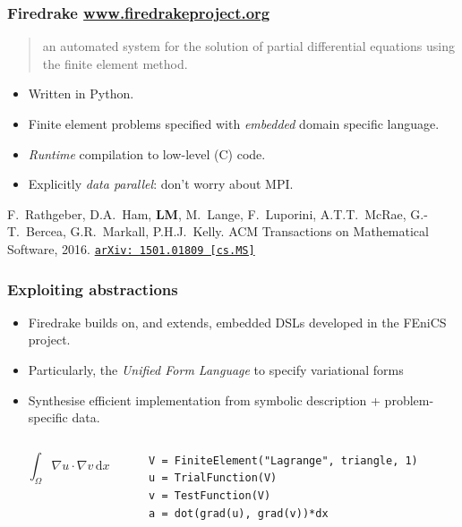 \documentclass[presentation]{beamer}
\newcommand{\arxivlink}[2]{%
  \href{http://www.arxiv.org/abs/#1}%
  {\texttt{arXiv:\,#1\,[#2]}}%
}
\begin{document}
\begin{frame}
  \frametitle{Firedrake \url{www.firedrakeproject.org}}

  \begin{quote}
    {\normalfont [\ldots]} an automated system for the solution of partial
    differential equations using the finite element method.
  \end{quote}

  \begin{itemize}
  \item Written in Python.
  \item Finite element problems specified with \emph{embedded} domain
    specific language.
  \item \emph{Runtime} compilation to low-level (C) code.
  \item Explicitly \emph{data parallel}: don't worry about MPI.
  \end{itemize}

  \begin{flushright}
    {\scriptsize F.~Rathgeber, D.A.~Ham, \textbf{LM}, M.~Lange,
      F.~Luporini, A.T.T.~McRae, G.-T.~Bercea, G.R.~Markall,
      P.H.J.~Kelly. ACM Transactions on Mathematical Software,
      2016. \arxivlink{1501.01809}{cs.MS}\nocite{Rathgeber:2016}}
  \end{flushright}
\end{frame}

\begin{frame}[fragile]
  \frametitle{Exploiting abstractions}
  \begin{itemize}
  \item Firedrake builds on, and extends, embedded DSLs developed in
    the FEniCS project.
  \item Particularly, the \emph{Unified Form Language} \parencite{Alnaes:2014} to
    specify variational forms
  \item Synthesise efficient implementation from symbolic description
    + problem-specific data.
  \end{itemize}
  \begin{columns}
    \begin{column}{0.4\textwidth}
      \begin{equation*}
        \int_\Omega \nabla u \cdot \nabla v\,\text{d}x
      \end{equation*}
    \end{column}
    \hspace{-3em}
    \begin{column}{0.6\textwidth}
\begin{verbatim}
V = FiniteElement("Lagrange", triangle, 1)
u = TrialFunction(V)
v = TestFunction(V)
a = dot(grad(u), grad(v))*dx
\end{verbatim}
    \end{column}
  \end{columns}
\end{frame}
\end{document}
